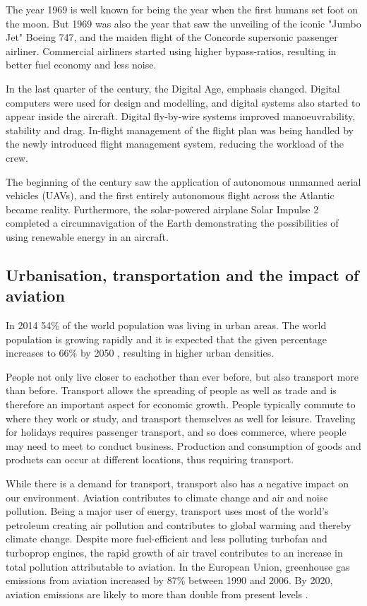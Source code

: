 The year 1969 is well known for being the year when the first humans set foot on
the moon. But 1969 was also the year that saw the unveiling of the iconic "Jumbo
Jet" Boeing 747, and the maiden flight of the Concorde supersonic passenger
airliner. Commercial airliners started using higher bypass-ratios, resulting in
better fuel economy and less noise. 

In the last quarter of the  century, the Digital Age, emphasis changed.
Digital computers were used for design and modelling, and digital systems also
started to appear inside the aircraft. Digital fly-by-wire systems improved
manoeuvrability, stability and drag. In-flight management of the flight plan was
being handled by the newly introduced flight management system, reducing the
workload of the crew.

The beginning of the  century saw the application of autonomous unmanned
aerial vehicles (UAVs), and the first entirely autonomous flight across the
Atlantic became reality. Furthermore, the solar-powered airplane Solar Impulse 2
completed a circumnavigation of the Earth demonstrating the possibilities of
using renewable energy in an aircraft.

\subsection{Urbanisation, transportation and the impact of aviation}
In 2014 54\% of the world population was living in urban areas. %
The world population is growing rapidly and it is expected that the given
percentage increases to 66\% by 2050 \cite{UnitedNations2014}, resulting
in higher urban densities.

People not only live closer to eachother than ever before, but also transport
more than before. Transport allows the spreading of people as well as trade and
is therefore an important aspect for economic growth. People typically commute
to where they work or study, and transport themselves as well for leisure.
Traveling for holidays requires passenger transport, and so does commerce, where
people may need to meet to conduct business. Production and consumption of goods
and products can occur at different locations, thus requiring transport.

While there is a demand for transport, transport also has a negative impact on
our environment. Aviation contributes to climate change and air and noise
pollution.
Being a major user of energy, transport uses most of the world's petroleum
creating air pollution and contributes to global warming and thereby climate
change. Despite more fuel-efficient and less polluting turbofan and turboprop
engines, the rapid growth of air travel contributes to an
increase in total pollution attributable to aviation. In the European Union,
greenhouse gas emissions from aviation increased by 87\% between 1990 and 2006.
By 2020, aviation emissions are likely to more than double from present levels
\cite{European2006}.

